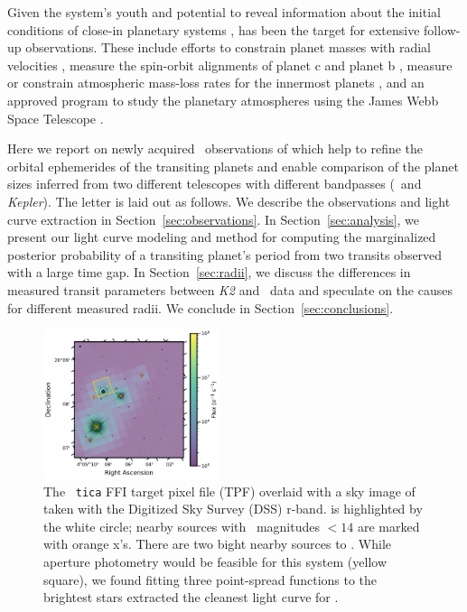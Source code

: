 \documentclass[linenumbers,modern,twocolumn]{aastex631}
\begin{document}
Given the system's youth and potential to reveal information about the initial conditions of close-in planetary systems \citep[e.g.][]{Owen2020,Poppenhaeger2021}, \sname has been the target for extensive follow-up observations. These include efforts to constrain planet masses with radial velocities \citep{Beichman2019}, measure the spin-orbit alignments of planet c \citep{Feinstein21} and planet b \citep{johnson21, gaidos21}, measure or constrain atmospheric mass-loss rates for the innermost planets \citep{Schlawin21, Vissapragada21}, and an approved program to study the planetary atmospheres using the James Webb Space Telescope \citep[JWST;][]{Desert2021}.

Here we report on newly acquired \tess\ observations of \sname which help to refine the orbital ephemerides of the transiting planets and enable comparison of the planet sizes inferred from two different telescopes with different bandpasses (\tess\ and \textit{Kepler}). The letter is laid out as follows. We describe the observations and light curve extraction in Section~\ref{sec:observations}. In Section~\ref{sec:analysis}, we present our light curve modeling and method for computing the marginalized posterior probability of a transiting planet's period from two transits observed with a large time gap. In Section~\ref{sec:radii}, we discuss the differences in measured transit parameters between \textit{K2} and \tess\ data and speculate on the causes for different measured radii. We conclude in Section~\ref{sec:conclusions}.

\begin{figure}[t!]
\begin{center}
\includegraphics[width=0.46\textwidth,trim={0.25cm 0 0 0}]{static/TESSaperture.pdf}
\caption{The \tess\ \texttt{tica} FFI target pixel file (TPF) overlaid with a sky image of \sname taken with the Digitized Sky Survey (DSS) r-band. \sname is highlighted by the white circle; nearby sources with \tess\ magnitudes $< 14$ are marked with orange x's. There are two bight nearby sources to \sname. While aperture photometry would be feasible for this system (yellow square), we found fitting three point-spread functions to the brightest stars extracted the cleanest light curve for \sname. \href{https://github.com/afeinstein20/v1298tau_tess/blob/main/src/figures/tpf.py}{\github}} \label{fig:tpf}
\end{center}
\end{figure}
\end{document}
